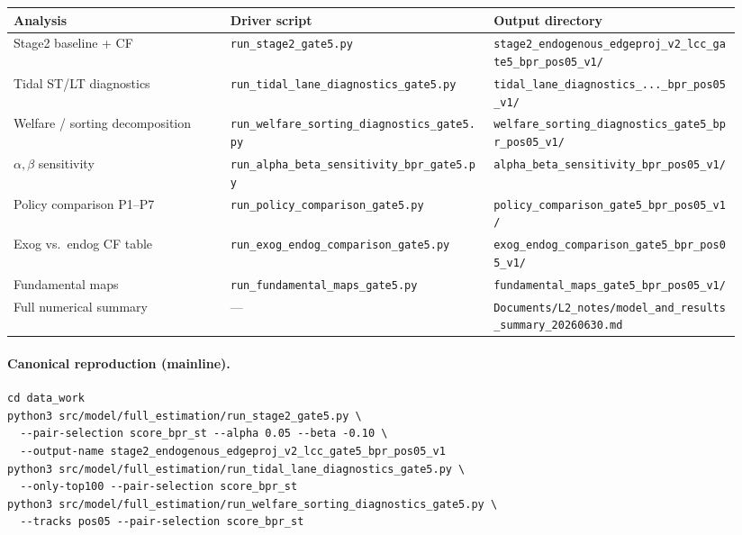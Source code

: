 \documentclass[11pt]{article}
\begin{document}
\begin{longtable}{@{}p{0.28\linewidth}p{0.34\linewidth}p{0.32\linewidth}@{}}
\toprule
\textbf{Analysis} & \textbf{Driver script} & \textbf{Output directory} \\
\midrule
\endhead
Stage2 baseline + CF &
  \texttt{run\_stage2\_gate5.py} &
  \texttt{stage2\_endogenous\_edgeproj\_v2\_lcc\_gate5\_bpr\_pos05\_v1/} \\
Tidal ST/LT diagnostics &
  \texttt{run\_tidal\_lane\_diagnostics\_gate5.py} &
  \texttt{tidal\_lane\_diagnostics\_...\_bpr\_pos05\_v1/} \\
Welfare / sorting decomposition &
  \texttt{run\_welfare\_sorting\_diagnostics\_gate5.py} &
  \texttt{welfare\_sorting\_diagnostics\_gate5\_bpr\_pos05\_v1/} \\
$\alpha,\beta$ sensitivity &
  \texttt{run\_alpha\_beta\_sensitivity\_bpr\_gate5.py} &
  \texttt{alpha\_beta\_sensitivity\_bpr\_pos05\_v1/} \\
Policy comparison P1--P7 &
  \texttt{run\_policy\_comparison\_gate5.py} &
  \texttt{policy\_comparison\_gate5\_bpr\_pos05\_v1/} \\
Exog vs.\ endog CF table &
  \texttt{run\_exog\_endog\_comparison\_gate5.py} &
  \texttt{exog\_endog\_comparison\_gate5\_bpr\_pos05\_v1/} \\
Fundamental maps &
  \texttt{run\_fundamental\_maps\_gate5.py} &
  \texttt{fundamental\_maps\_gate5\_bpr\_pos05\_v1/} \\
Full numerical summary &
  --- &
  \texttt{Documents/L2\_notes/model\_and\_results\_summary\_20260630.md} \\
\bottomrule
\end{longtable}

\paragraph{Canonical reproduction (mainline).}
\begin{verbatim}
cd data_work
python3 src/model/full_estimation/run_stage2_gate5.py \
  --pair-selection score_bpr_st --alpha 0.05 --beta -0.10 \
  --output-name stage2_endogenous_edgeproj_v2_lcc_gate5_bpr_pos05_v1
python3 src/model/full_estimation/run_tidal_lane_diagnostics_gate5.py \
  --only-top100 --pair-selection score_bpr_st
python3 src/model/full_estimation/run_welfare_sorting_diagnostics_gate5.py \
  --tracks pos05 --pair-selection score_bpr_st
\end{verbatim}

\end{document}
